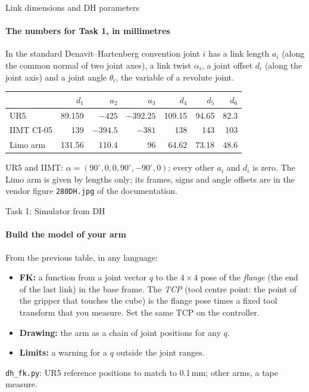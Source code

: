 \documentclass[aspectratio=169]{beamer}
\begin{document}
\begin{frame}[t]{Link dimensions and DH parameters}
\framesubtitle{The numbers for Task 1, in millimetres}
    \footnotesize
    In the standard Denavit--Hartenberg convention joint $i$ has a link length $a_i$ (along the
    common normal of two joint axes), a link twist $\alpha_i$, a joint offset $d_i$ (along the
    joint axis) and a joint angle $\theta_i$, the variable of a revolute joint.
    \smallskip

    \begin{center}
    \begin{tabular}{@{}lrrrrrr@{}}
        \toprule
        & $d_1$ & $a_2$ & $a_3$ & $d_4$ & $d_5$ & $d_6$ \\
        \midrule
        UR5        & 89.159 & $-425$   & $-392.25$ & 109.15 & 94.65 & 82.3 \\
        IIMT CI-05 & 139    & $-394.5$ & $-381$    & 138    & 143   & 103  \\
        Limo arm   & 131.56 & 110.4    & 96        & 64.62  & 73.18 & 48.6 \\
        \bottomrule
    \end{tabular}
    \end{center}
    \smallskip

    UR5 and IIMT: $\alpha = (90^\circ, 0, 0, 90^\circ, -90^\circ, 0)$; every other $a_i$ and $d_i$
    is zero. The Limo arm is given by lengths only; its frames, signs and angle offsets are in
    the vendor figure \texttt{280DH.jpg} of the documentation.
\end{frame}

\begin{frame}[t]{Task 1: Simulator from DH}
\framesubtitle{Build the model of your arm}
    From the previous table, in any language:
    \begin{itemize}
        \item \textbf{FK:} a function from a joint vector $q$ to the $4\times4$ pose of the
              \emph{flange} (the end of the last link) in the base frame. The
              \emph{TCP} (tool centre point: the point of the gripper that touches the cube)
              is the flange pose times a fixed tool transform that you measure.
              Set the same TCP on the controller.
        \item \textbf{Drawing:} the arm as a chain of joint positions for any $q$.
        \item \textbf{Limits:} a warning for a $q$ outside the joint ranges.
    \end{itemize}
    \smallskip

    \texttt{dh\_fk.py}: UR5 reference positions to match to 0.1\,mm; other arms, a tape measure.
\end{frame}
\end{document}
